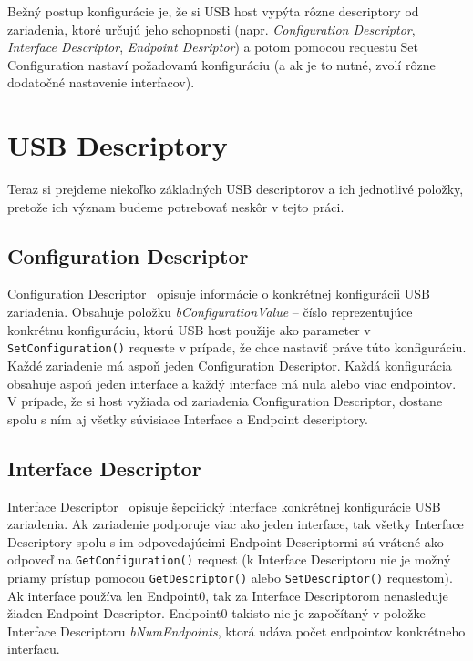 Bežný postup konfigurácie je, že si USB host vypýta rôzne descriptory od zariadenia, ktoré určujú jeho schopnosti (napr. \textit{Configuration Descriptor}, \textit{Interface Descriptor}, \textit{Endpoint Desriptor}) a potom pomocou requestu Set Configuration nastaví požadovanú konfiguráciu (a ak je to nutné, zvolí rôzne dodatočné nastavenie interfacov).



\section{USB Descriptory}
Teraz si prejdeme niekoľko základných USB descriptorov a ich jednotlivé položky, pretože ich význam budeme potrebovať neskôr v tejto práci. 


\subsection*{Configuration Descriptor}
Configuration Descriptor~\cite{usb_chap9_conf_desc} opisuje informácie o konkrétnej konfigurácii USB zariadenia. Obsahuje položku \textit{bConfigurationValue} -- číslo reprezentujúce konkrétnu konfiguráciu, ktorú USB host použije ako parameter v \texttt{SetConfiguration()} requeste v prípade, že chce nastaviť práve túto konfiguráciu. Každé zariadenie má aspoň jeden Configuration Descriptor. Každá konfigurácia obsahuje aspoň jeden interface a každý interface má nula alebo viac endpointov. V prípade, že si host vyžiada od zariadenia Configuration Descriptor, dostane spolu s ním aj všetky súvisiace Interface a Endpoint descriptory.


\subsection*{Interface Descriptor}
Interface Descriptor~\cite{usb_chap9_interf_desc} opisuje šepcifický interface konkrétnej konfigurácie USB zariadenia. Ak zariadenie podporuje viac ako jeden interface, tak všetky Interface Descriptory spolu s im odpovedajúcimi Endpoint Descriptormi sú vrátené ako odpoveď na \texttt{GetConfiguration()} request (k Interface Descriptoru nie je možný priamy prístup pomocou \texttt{GetDescriptor()} alebo \texttt{SetDescriptor()} requestom). Ak interface používa len Endpoint0, tak za Interface Descriptorom nenasleduje žiaden Endpoint Descriptor. Endpoint0 takisto nie je započítaný v položke Interface Descriptoru \textit{bNumEndpoints}, ktorá udáva počet endpointov konkrétneho interfacu.


